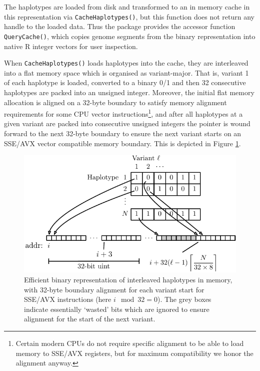 \documentclass[pdflatex,referee,lineno,sn-nature]{sn-jnl}%
\let\proglang=\textsf
\begin{document}
The haplotypes are loaded from disk and transformed to an in memory cache in this representation via \texttt{CacheHaplotypes()}, but this function does not return any handle to the loaded data.
Thus the package provides the accessor function \texttt{QueryCache()}, which copies genome segments from the binary representation into native \proglang{R} integer vectors for user inspection.

When \texttt{CacheHaplotypes()} loads haplotypes into the cache, they are interleaved into a flat memory space which is organised as variant-major.
That is, variant 1 of each haplotype is loaded, converted to a binary 0/1 and then 32 consecutive haplotypes are packed into an unsigned integer.
Moreover, the initial flat memory allocation is aligned on a 32-byte boundary to satisfy memory alignment requirements for some CPU vector instructions\footnote{Certain modern CPUs do not require specific alignment to be able to load memory to SSE/AVX registers, but for maximum compatibility we honor the alignment anyway.}, and after all haplotypes at a given variant are packed into consecutive unsigned integers the pointer is wound forward to the next 32-byte boundary to ensure the next variant starts on an SSE/AVX vector compatible memory boundary.
This is depicted in Figure \ref{fig:hapsmem}.

\begin{figure}
  \centering
  \includegraphics{fig1}
  \caption{
    Efficient binary representation of interleaved haplotypes in memory, with 32-byte boundary alignment for each variant start for SSE/AVX instructions (here $i \mod 32 = 0$).
    The grey boxes indicate essentially `wasted' bits which are ignored to ensure alignment for the start of the next variant.
  }
  \label{fig:hapsmem}
\end{figure}
\end{document}
